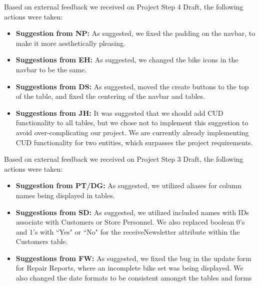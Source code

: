 \documentclass{article}
\begin{document}
\vspace{0.5cm}
\begin{tcolorbox}[colback=secondarycolor, colframe=primarycolor, arc=5mm, title=\textbf{Step 4 --> Step 5 }]
Based on external feedback we received on Project Step 4 Draft, the following actions were taken:
\vspace{0.2cm}
\begin{itemize}
   \item \textbf{Suggestion from NP:} As suggested, we fixed the padding on the navbar, to make it more aesthetically pleasing.
   \vspace{0.1cm}
   \item \textbf{Suggestions from EH:} As suggested, we changed the bike icons in the navbar to be the same.
   \vspace{0.1cm}
   \item \textbf{Suggestions from DS:} As suggested, moved the create buttons to the top of the table, and fixed the centering of the navbar and tables.
      \vspace{0.1cm}
   \item \textbf{Suggestions from JH:} It was suggested that we should add CUD functionality to all tables, but we chose not to implement this suggestion to avoid over-complicating our project. We are currently already implementing CUD functionality for two entities, which surpasses the project requirements.
 \end{itemize}
\vspace{0.2cm}
\end{tcolorbox}

\vspace{0.5cm}
\begin{tcolorbox}[colback=secondarycolor, colframe=primarycolor, arc=5mm, title=\textbf{Step 3 --> Step 4 }]
Based on external feedback we received on Project Step 3 Draft, the following actions were taken:
\vspace{0.2cm}
\begin{itemize}
   \item \textbf{Suggestion from PT/DG:} As suggested, we utilized aliases for column names being displayed in tables.
   \vspace{0.1cm}
   \item \textbf{Suggestions from SD:} As suggested, we utilized included names with IDs associate with Customers or Store Personnel. We also replaced boolean 0's and 1's with ``Yes" or ``No" for the receiveNewsletter attribute within the Customers table.
   \vspace{0.1cm}
   \item \textbf{Suggestions from FW:} As suggested, we fixed the bug in the update form for Repair Reports, where an incomplete bike set was being displayed. We also changed the date formats to be consistent amongst the tables and forms
 \end{itemize}
\vspace{0.2cm}

\end{tcolorbox}
\end{document}
